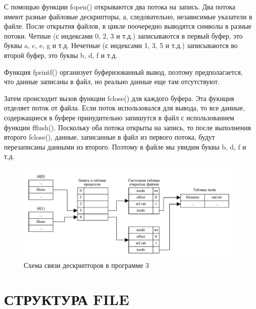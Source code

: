 С помощью функции {\ttfamily fopen()} открываются два потока на запись. Два
потока имеют разные файловые дескрипторы, а, следовательно, независимые указатели
в файле. После открытия файлов, в цикле поочередно выводятся символы в разные
потоки. Четные (с индексами 0, 2, 3 и т.д.) записываются в первый буфер,
это буквы a, c, e, g и т.д. Нечетные (с индексами 1, 3, 5 и т.д.) записываются
во второй буфер, это буквы b, d, f и т.д.

Функция {\ttfamily fprintf()} организует буферизованный вывод,
поэтому предполагается, что данные записаны в файл, но реально данные еще
там отсутствуют.

Затем происходит вызов функции {\ttfamily fclose()} для каждого буфера. Эта
фукнция отделяет поток от файла. Если поток использовался для вывода, то
все данные, содержащиеся в буфере принудительно запишутся в файл с использованием
функции {\ttfamily fflush()}.
Поскольку оба потока открыты на запись, то
после выполнения второго {\ttfamily fclose()}, данные, записанные в файл из
первого потока, будут перезаписаны данными из второго. Поэтому в файле
мы увидим буквы b, d, f и т.д.

\begin{figure}[H]
    \centering
    \includegraphics[scale=0.8]{img/3.pdf}
    \caption{Схема связи дескрипторов в программе 3}
\end{figure}

\section{СТРУКТУРА FILE}

